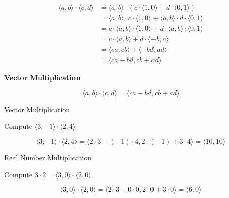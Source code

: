 \documentclass{ximera}
\begin{document}
\begin{align*}
\langle a, b \rangle  \cdot \langle c, d \rangle & = \langle a, b \rangle  \cdot (  c \cdot \langle 1, 0 \rangle    +  d \cdot \langle 0, 1 \rangle    )    \\
    & = \langle a, b \rangle \cdot c \cdot \langle 1, 0 \rangle     +      \langle a, b \rangle \cdot d \cdot \langle 0, 1 \rangle      \\
    & = c \cdot \langle a, b \rangle \cdot  \langle 1, 0 \rangle     +    d \cdot  \langle a, b \rangle \cdot  \langle 0, 1 \rangle      \\
    & = c \cdot \langle a, b \rangle   + d \cdot  \langle -b, a \rangle \\
    & =  \langle c a, c b \rangle   +   \langle -b d, a d \rangle \\
    & =  \langle c a - b d, c b + a d \rangle   
\end{align*} 







\begin{definition}  \textbf{\textcolor{green!50!black}{Vector Multiplication}}  


\[    \langle a, b \rangle  \cdot \langle c, d \rangle =   \langle c a - b d, c b + a d \rangle   \]


\end{definition}








\begin{example} Vector Multiplication

Compute  $\langle 3, -1 \rangle  \cdot \langle 2, 4 \rangle$

\begin{explanation}


\[
\langle 3, -1 \rangle  \cdot \langle 2, 4 \rangle = \langle 2 \cdot 3 - (-1) \cdot 4, 2 \cdot (-1) + 3 \cdot 4 \rangle = \langle 10, 10 \rangle 
\]
\end{explanation}

\end{example}











\begin{example} Real Number Multiplication

Compute  $3 \cdot 2 = \langle 3, 0 \rangle  \cdot \langle 2, 0 \rangle$

\begin{explanation}


\[
\langle 3, 0 \rangle  \cdot \langle 2, 0 \rangle = \langle 2 \cdot 3 - 0 \cdot 0, 2 \cdot 0 + 3 \cdot 0 \rangle = \langle 6, 0 \rangle 
\]
\end{explanation}

\end{example}
\end{document}

